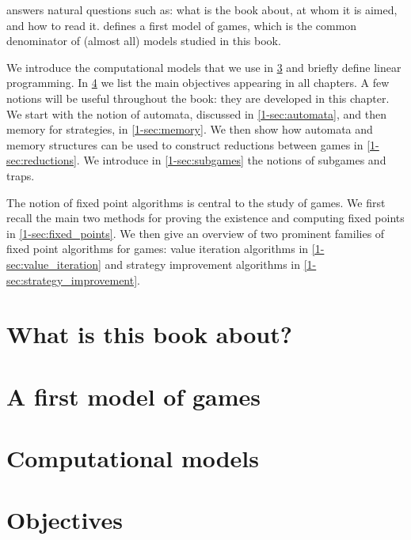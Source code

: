 

 answers natural questions such as: what is the book about, at whom it is aimed, and how to read it.
 defines a first model of games, which is the common denominator of (almost all) models studied in this book.

We introduce the computational models that we use in \cref{1-sec:computation} and briefly define linear programming.
In \cref{1-sec:conditions} we list the main objectives appearing in all chapters.
A few notions will be useful throughout the book: they are developed in this chapter.
We start with the notion of automata, discussed in \cref{1-sec:automata}, and then memory for strategies, in \cref{1-sec:memory}.
We then show how automata and memory structures can be used to construct reductions between games in \cref{1-sec:reductions}.
We introduce in \cref{1-sec:subgames} the notions of subgames and traps.

The notion of fixed point algorithms is central to the study of games.
We first recall the main two methods for proving the existence and computing fixed points in \cref{1-sec:fixed_points}.
We then give an overview of two prominent families of fixed point algorithms for games:
value iteration algorithms in \cref{1-sec:value_iteration} and strategy improvement algorithms in \cref{1-sec:strategy_improvement}.

\section{What is this book about?}
\label{1-sec:intro}



\section{A first model of games}
\label{1-sec:simple}



\section{Computational models}
\label{1-sec:computation}



\section{Objectives}
\label{1-sec:conditions}



